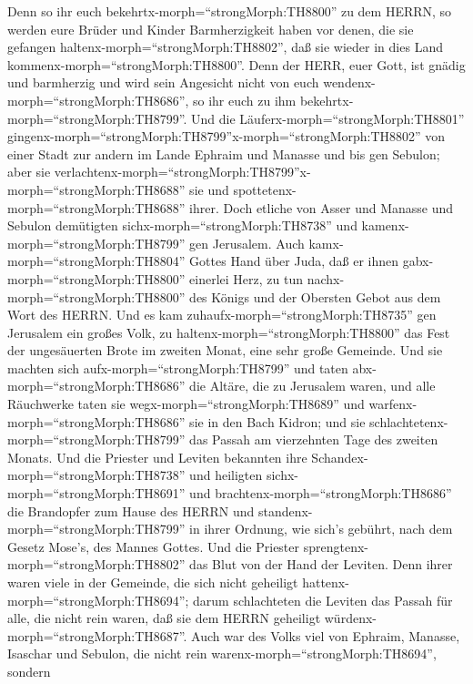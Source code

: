  Denn so ihr euch bekehrtx-morph=``strongMorph:TH8800'' zu
dem HERRN, so werden eure Brüder und Kinder Barmherzigkeit haben vor
denen, die sie gefangen haltenx-morph=``strongMorph:TH8802'', daß sie
wieder in dies Land kommenx-morph=``strongMorph:TH8800''. Denn der HERR,
euer Gott, ist gnädig und barmherzig und wird sein Angesicht nicht von
euch wendenx-morph=``strongMorph:TH8686'', so ihr euch zu ihm
bekehrtx-morph=``strongMorph:TH8799''.  Und die
Läuferx-morph=``strongMorph:TH8801''
gingenx-morph=``strongMorph:TH8799''x-morph=``strongMorph:TH8802'' von
einer Stadt zur andern im Lande Ephraim und Manasse und bis gen Sebulon;
aber sie
verlachtenx-morph=``strongMorph:TH8799''x-morph=``strongMorph:TH8688''
sie und spottetenx-morph=``strongMorph:TH8688'' ihrer. 
Doch etliche von Asser und Manasse und Sebulon demütigten
sichx-morph=``strongMorph:TH8738'' und
kamenx-morph=``strongMorph:TH8799'' gen Jerusalem.  Auch
kamx-morph=``strongMorph:TH8804'' Gottes Hand über Juda, daß er ihnen
gabx-morph=``strongMorph:TH8800'' einerlei Herz, zu tun
nachx-morph=``strongMorph:TH8800'' des Königs und der Obersten Gebot aus
dem Wort des HERRN.  Und es kam
zuhaufx-morph=``strongMorph:TH8735'' gen Jerusalem ein großes Volk, zu
haltenx-morph=``strongMorph:TH8800'' das Fest der ungesäuerten Brote im
zweiten Monat, eine sehr große Gemeinde.  Und sie machten
sich aufx-morph=``strongMorph:TH8799'' und taten
abx-morph=``strongMorph:TH8686'' die Altäre, die zu Jerusalem waren, und
alle Räuchwerke taten sie wegx-morph=``strongMorph:TH8689'' und
warfenx-morph=``strongMorph:TH8686'' sie in den Bach Kidron;
 und sie schlachtetenx-morph=``strongMorph:TH8799'' das
Passah am vierzehnten Tage des zweiten Monats. Und die Priester und
Leviten bekannten ihre Schandex-morph=``strongMorph:TH8738'' und
heiligten sichx-morph=``strongMorph:TH8691'' und
brachtenx-morph=``strongMorph:TH8686'' die Brandopfer zum Hause des
HERRN  und standenx-morph=``strongMorph:TH8799'' in ihrer
Ordnung, wie sich's gebührt, nach dem Gesetz Mose's, des Mannes Gottes.
Und die Priester sprengtenx-morph=``strongMorph:TH8802'' das Blut von
der Hand der Leviten.  Denn ihrer waren viele in der
Gemeinde, die sich nicht geheiligt hattenx-morph=``strongMorph:TH8694'';
darum schlachteten die Leviten das Passah für alle, die nicht rein
waren, daß sie dem HERRN geheiligt würdenx-morph=``strongMorph:TH8687''.
 Auch war des Volks viel von Ephraim, Manasse, Isaschar und
Sebulon, die nicht rein warenx-morph=``strongMorph:TH8694'', sondern
